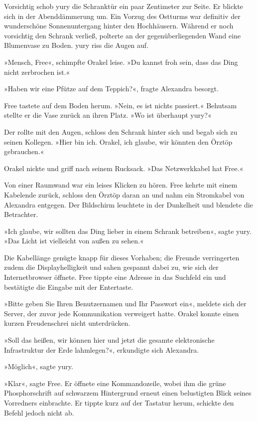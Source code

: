 Vorsichtig schob yury die Schranktür ein paar Zentimeter zur Seite. Er blickte sich in der Abenddämmerung um. Ein Vorzug des Ostturms war definitiv der wunderschöne Sonnenuntergang hinter den Hochhäusern. Während er noch vorsichtig den Schrank verließ, polterte an der gegenüberliegenden Wand eine Blumenvase zu Boden. yury riss die Augen auf.

»Mensch, Free«, schimpfte Orakel leise. »Du kannst froh sein, dass das Ding nicht zerbrochen ist.«

»Haben wir eine Pfütze auf dem Teppich?«, fragte Alexandra besorgt.

Free tastete auf dem Boden herum. »Nein, es ist nichts passiert.« Behutsam stellte er die Vase zurück an ihren Platz. »Wo ist überhaupt yury?«

Der rollte mit den Augen, schloss den Schrank hinter sich und begab sich zu seinen Kollegen. »Hier bin ich. Orakel, ich glaube, wir könnten den Örztöp gebrauchen.«

Orakel nickte und griff nach seinem Rucksack. »Das Netzwerkkabel hat Free.«

Von einer Raumwand war ein leises Klicken zu hören. Free kehrte mit einem Kabelende zurück, schloss den Örztöp daran an und nahm ein Stromkabel von Alexandra entgegen. Der Bildschirm leuchtete in der Dunkelheit und blendete die Betrachter.

»Ich glaube, wir sollten das Ding lieber in einem Schrank betreiben«, sagte yury. »Das Licht ist vielleicht von außen zu sehen.«

Die Kabellänge genügte knapp für dieses Vorhaben; die Freunde verringerten zudem die Displayhelligkeit und sahen gespannt dabei zu, wie sich der Internetbrowser öffnete. Free tippte eine Adresse in das Suchfeld ein und bestätigte die Eingabe mit der Entertaste.

»Bitte geben Sie Ihren Benutzernamen und Ihr Passwort ein«, meldete sich der Server, der zuvor jede Kommunikation verweigert hatte. Orakel konnte einen kurzen Freudenschrei nicht unterdrücken.

»Soll das heißen, wir können hier und jetzt die gesamte elektronische Infrastruktur der Erde lahmlegen?«, erkundigte sich Alexandra.

»Möglich«, sagte yury.

»Klar«, sagte Free. Er öffnete eine Kommandozeile, wobei ihm die grüne Phosphorschrift auf schwarzem Hintergrund erneut einen belustigten Blick seines Vorredners einbrachte. Er tippte kurz auf der Tastatur herum, schickte den Befehl jedoch nicht ab.

